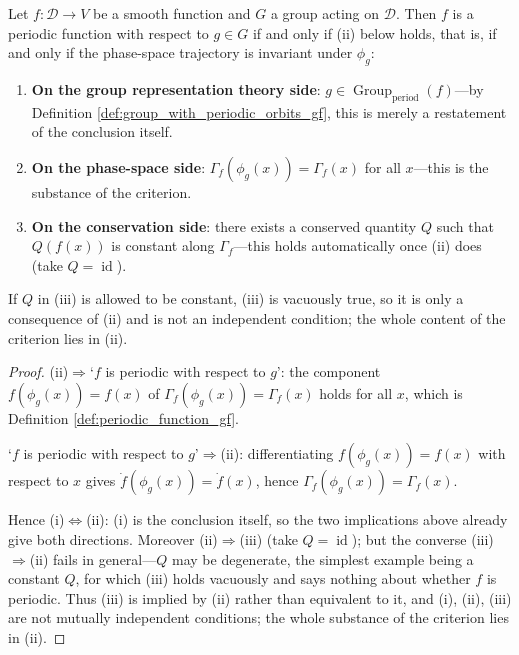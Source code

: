 \begin{theorem}\label{thm:phase_group_joint_criterion}
Let $f: \mathcal{D} \to V$ be a smooth function and $G$ a group acting on $\mathcal{D}$. Then $f$ is a periodic function with respect to $g \in G$ if and only if (ii) below holds, that is, if and only if the phase-space trajectory is invariant under $\phi_g$:
\begin{enumerate}[label=(\roman*)]
    \item \textbf{On the group representation theory side}: $g \in \operatorname{Group}_{\mathrm{period}}(f)$---by Definition \ref{def:group_with_periodic_orbits_gf}, this is merely a restatement of the conclusion itself.
    \item \textbf{On the phase-space side}: $\Gamma_f(\phi_g(x)) = \Gamma_f(x)$ for all $x$---this is the substance of the criterion.
    \item \textbf{On the conservation side}: there exists a conserved quantity $Q$ such that $Q(f(x))$ is constant along $\Gamma_f$---this holds automatically once (ii) does (take $Q=\operatorname{id}$).
\end{enumerate}
If $Q$ in (iii) is allowed to be constant, (iii) is vacuously true, so it is only a consequence of (ii) and is not an independent condition; the whole content of the criterion lies in (ii).
\end{theorem}

\begin{proof}
(ii)$\Rightarrow$`$f$ is periodic with respect to $g$': the component $f(\phi_g(x)) = f(x)$ of $\Gamma_f(\phi_g(x)) = \Gamma_f(x)$ holds for all $x$, which is Definition \ref{def:periodic_function_gf}.

`$f$ is periodic with respect to $g$'$\Rightarrow$(ii): differentiating $f(\phi_g(x)) = f(x)$ with respect to $x$ gives $\dot{f}(\phi_g(x)) = \dot{f}(x)$, hence $\Gamma_f(\phi_g(x)) = \Gamma_f(x)$.

Hence (i)$\Leftrightarrow$(ii): (i) is the conclusion itself, so the two implications above already give both directions. Moreover (ii)$\Rightarrow$(iii) (take $Q=\operatorname{id}$); but the converse (iii)$\Rightarrow$(ii) fails in general---$Q$ may be degenerate, the simplest example being a constant $Q$, for which (iii) holds vacuously and says nothing about whether $f$ is periodic. Thus (iii) is implied by (ii) rather than equivalent to it, and (i), (ii), (iii) are not mutually independent conditions; the whole substance of the criterion lies in (ii).
\end{proof}

